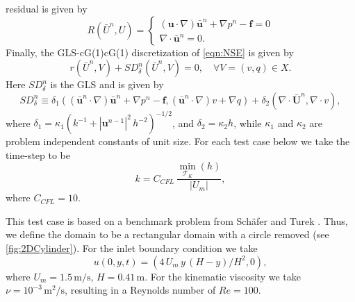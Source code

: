    residual is given by
    \begin{equation}
        R(\bar{U}^n,U) = \begin{cases}
        \left(\mathbf{u} \cdot \nabla \right) \bar{\mathbf{u}}^n
            + \nabla p^n - \mathbf{f} = 0 \\
        \nabla \cdot \bar{\mathbf{u}}^n = 0.
        \end{cases}
    \label{eqn:StrongNSE}
    \end{equation}
    Finally, the GLS-cG(1)cG(1) discretization of \eqref{eqn:NSE} is given by
    \begin{equation}
    r(\bar{U}^n,V) + SD_{\delta}^n(\bar{U}^n,V) = 0, \quad \forall V=(v,q) \in X.
    \label{eqn:G2}
    \end{equation}
    Here $SD_{\delta}^n$ is the GLS and is given by
    \begin{equation}
    SD_{\delta}^n \equiv
        \delta_1 (\left(\bar{\mathbf{u}}^n \cdot \nabla \right) \bar{\mathbf{u}}^n
            + \nabla p^n - \mathbf{f},
        \left(\bar{\mathbf{u}}^n \cdot \nabla \right) v + \nabla q)
        + \delta_2 (\nabla \cdot \bar{\mathbf{U}}^n, \nabla \cdot v),
    \label{eqn:NSEStabilization}
    \end{equation}
    where $\delta_1 = \kappa_1 (k^{-1} + |\mathbf{u}^{n-1}|^2\, h^{-2})^{-1/2}$, and
    $\delta_2 = \kappa_2 h$, while $\kappa_1$ and $\kappa_2$ are problem independent
    constants of unit size. For each test case below we take the time-step to be
    \begin{equation*}
    k = C_{CFL}\, \frac{\min_{\mathcal{T}_K}(h)}{|U_m|},
    \end{equation*}
    where $C_{CFL}=10$.

    This test case is based on a benchmark problem from Sch\"afer and Turek
    \cite[Test case 2D-2]{Schaefer1996}. Thus, we define the domain to be a
    rectangular domain with a circle removed (see \autoref{fig:2DCylinder}). For
    the inlet boundary condition we take
    \begin{equation}
        u(0,y,t) = (4\, U_m\,y\, (H - y)/H^2, 0),
        \label{eqn:2DInlet}
    \end{equation}
    where $U_m = 1.5\, \text{m/s}$, $H = 0.41\, \text{m}$. For the kinematic
    viscosity we take $\nu = 10^{-3}\, \text{m}^2\text{/s}$, resulting in a
    Reynolds number of $Re=100$.

